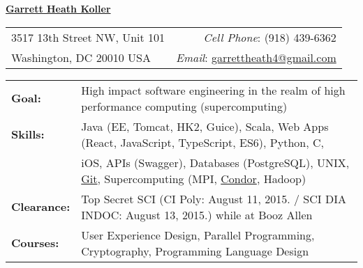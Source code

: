 \documentclass[11pt, letterpaper]{letter}
\newlength{\firstSectionSpacing} \setlength{\firstSectionSpacing}{6pt}
\newlength{\sectionSpacing}      \setlength{\sectionSpacing}{-1pt}
\begin{document}
\sffamily

\begin{center}{
	\underline{\Large{\textbf{Garrett Heath Koller}}}
}\end{center}
\vspace{-8pt}

\begin{tabular*}{\textwidth}{l@{\extracolsep{\fill}}r}
	3517 13th Street NW, Unit 101 & \textit{Cell Phone}: (918) 439-6362 \\
	Washington, DC  20010 USA & \textit{Email}:
	\href{mailto:garrettheath4@gmail.com}{garrettheath4@gmail.com} \\
	\hline
\end{tabular*}

\vspace{\firstSectionSpacing}



\begin{tabular*}{\textwidth}{ p{2.2cm} l }
	{\large \textbf{Goal:}}      & High impact software engineering in the realm of
	                               high performance computing (supercomputing) \\
	{\large \textbf{Skills:}}    & Java (EE, Tomcat, HK2, Guice), Scala, Web Apps
	                               (React, JavaScript, TypeScript, ES6), Python, C,
	                               \\
	                             & iOS, APIs (Swagger), Databases (PostgreSQL),
	                               UNIX,
	                               \href{https://github.com/garrettheath4}{Git},
	                               Supercomputing (MPI,
	                               \href{http://www.htcondorproject.org/}{Condor},
	                               Hadoop) \\
	{\large \textbf{Clearance:}} & Top Secret SCI (CI Poly: August 11, 2015.  /  %
	                               SCI DIA INDOC: August 13, 2015.) while at Booz
	                               Allen \\
	{\large \textbf{Courses:}}   & User Experience Design, Parallel Programming,
	                               Cryptography, Programming Language Design
\end{tabular*}

\vspace{\firstSectionSpacing}
\vspace{\sectionSpacing}
\end{document}
